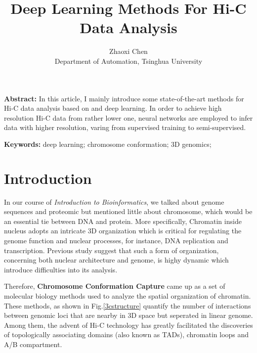 \documentclass{article}
\begin{document}
\title{Deep Learning Methods For Hi-C Data Analysis}
\author{Zhaoxi Chen \\ \small{Department of Automation, Tsinghua University}}
\maketitle

{\noindent\small{\textbf{Abstract:}
In this article, I mainly introduce some state-of-the-art methods for Hi-C data analysis based on and deep learning. In order to achieve high resolution Hi-C data from rather lower one, neural networks are employed to infer data with higher resolution, varing from supervised training\cite{hicplus} to semi-supervised\cite{hicgan}.
}}

{\noindent\small{\textbf{Keywords:}
deep learning; chromosome conformation; 3D genomics; 
}}

\tableofcontents
\newpage

\section{Introduction}
In our course of \textit{Introduction to Bioinformatics}, we talked about genome sequences and proteomic but mentioned little about chromosome, which would be an essential tie between DNA and protein. More specifically, Chromatin inside nucleus adopts an intricate 3D organization which is critical for regulating the genome function and nuclear processes, for instance, DNA replication and transcription. Previous study\cite{hic} suggest that such a form of organization, concerning both nuclear architecture and genome, is highy dynamic which introduce difficulties into its analysis.

Therefore, \textbf{Chromosome Conformation Capture}\cite{3c} came up as a set of molecular biology methods used to analyze the spatial organization of chromatin. These methods, as shown in Fig.\ref{3cstructure} quantify the number of interactions between genomic loci that are nearby in 3D space but seperated in linear genome. Among them, the advent of Hi-C technology has greatly facilitated the discoveries of topologically associating domains (also known as TADs), chromatin loops and A/B compartment.
\end{document}
